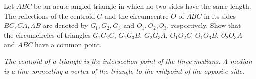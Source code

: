 Let $ABC$ be an acute-angled triangle in which no two sides have the same length. The reflections of the centroid $G$ and the circumcentre $O$ of $ABC$ in its sides $BC,CA,AB$ are denoted by $G_1,G_2,G_3$ and $O_1,O_2,O_3$, respectively. Show that the circumcircles of triangles $G_1G_2C$, $G_1G_3B$, $G_2G_3A$, $O_1O_2C$, $O_1O_3B$, $O_2O_3A$ and $ABC$ have a common point. 

\emph{The centroid of a triangle is the intersection point of the three medians. A median is a line connecting a vertex of the triangle to the midpoint of the opposite side.}